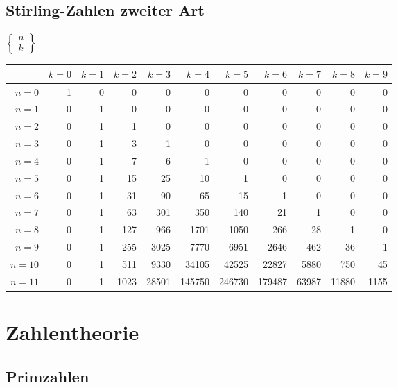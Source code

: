 \vspace{4em}
\subsection{Stirling-Zahlen zweiter Art}
$\begin{Bmatrix}n\\ k\end{Bmatrix}$

\vspace{4pt}
\noindent
\begin{tabular}{r|rrrrrrrrrr}
\toprule%
& $k=0$ & $k=1$ & $k=2$ & $k=3$ & $k=4$ & $k=5$ & $k=6$ & $k=7$ & $k=8$ & $k=9$\\
\midrule%
$n= 0$ &     1 &     0 &     0 &     0 &     0 &     0 &     0 &     0 &     0 &     0\\
$n= 1$ &     0 &     1 &     0 &     0 &     0 &     0 &     0 &     0 &     0 &     0\\
$n= 2$ &     0 &     1 &     1 &     0 &     0 &     0 &     0 &     0 &     0 &     0\\
$n= 3$ &     0 &     1 &     3 &     1 &     0 &     0 &     0 &     0 &     0 &     0\\
\midrule%
$n= 4$ &     0 &     1 &     7 &     6 &     1 &     0 &     0 &     0 &     0 &     0\\
$n= 5$ &     0 &     1 &    15 &    25 &    10 &     1 &     0 &     0 &     0 &     0\\
$n= 6$ &     0 &     1 &    31 &    90 &    65 &    15 &     1 &     0 &     0 &     0\\
$n= 7$ &     0 &     1 &    63 &   301 &   350 &   140 &    21 &     1 &     0 &     0\\
\midrule%
$n= 8$ &     0 &     1 &   127 &   966 &  1701 &  1050 &   266 &    28 &     1 &     0\\
$n= 9$ &     0 &     1 &   255 &  3025 &  7770 &  6951 &  2646 &   462 &    36 &     1\\
$n=10$ &     0 &     1 &   511 &  9330 & 34105 & 42525 & 22827 &  5880 &   750 &    45\\
$n=11$ &     0 &     1 &  1023 & 28501 &145750 &246730 &179487 & 63987 & 11880 &  1155\\
\bottomrule
\end{tabular}

\newpage
\section{Zahlentheorie}
\subsection{Primzahlen}

